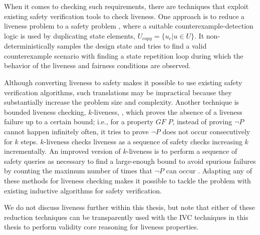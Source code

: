 
When it comes to checking such requirements, there are techniques that exploit existing safety verification tools to check liveness. One approach is to reduce a liveness problem to a safety problem \cite{Schuppan:2006}, where a suitable counterexample-detection logic is used by duplicating state elements,
 $U_{copy} = \{ u_c | u \in U \}$. It non-deterministically
samples the design state and tries to find a valid counterexample
scenario with finding a state repetition
loop during which the behavior of the liveness and fairness
conditions are observed.

Although converting liveness to safety makes it possible to use existing safety
verification algorithms, such translations may be impractical because they substantially increase the problem size and complexity. Another technique is bounded liveness checking, $k$-liveness, \cite{Schuppan:2006}, which proves the absence of a liveness failure up to a certain bound;
i.e., for a property $GF$ $P$, instead of proving $\neg P$ cannot happen infinitely often, it tries to prove $\neg P$ does not occur consecutively for $k$ steps. $k$-liveness checks liveness as a sequence of safety checks increasing $k$ incrementally.
An improved version of $k$-liveness is to perform a sequence of
safety queries as necessary to find a large-enough bound to
avoid spurious failures by counting the maximum number of times that $\neg P$ can occur \cite{claessen2012liveness}. Adapting any of these methods for liveness checking makes it possible to tackle the problem with existing inductive algorithms for safety verification.

We do not discuss liveness further within this thesis, but note that either of these reduction techniques can be transparently used with the IVC techniques in this thesis to perform validity core reasoning for liveness properties.

